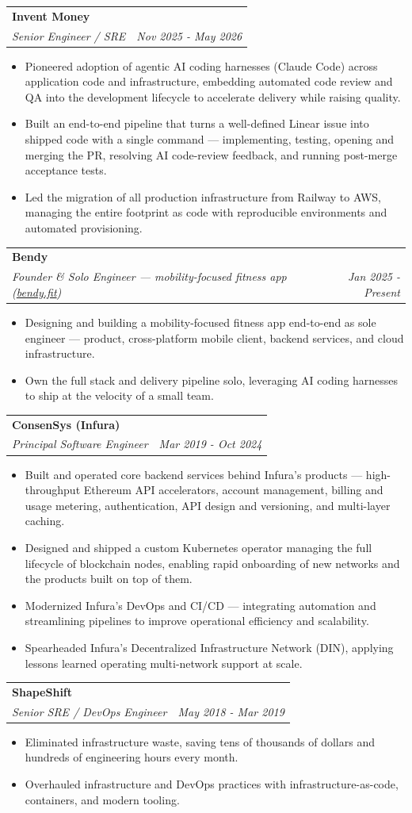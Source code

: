 \documentclass[letterpaper,11pt]{article}
\makeatletter
\newcommand{\resumeItemNoBold}[1]{
  \item\small{
    {#1 \vspace{-2pt}}
  }
}
\newcommand{\resumeSubheading}[3]{
  \needspace{4\baselineskip}\vspace{-1pt}\item
    \begin{tabular*}{0.97\textwidth}{l@{\extracolsep{\fill}}r}
      \textbf{\color{primary}#1} \\
      \textit{\small#2} & \textit{\small #3} \\
    \end{tabular*}\vspace{-5pt}
}
\newcommand{\resumeItemListStart}{\begin{itemize}[itemsep=0pt, topsep=2pt]}
\newcommand{\resumeItemListEnd}{\end{itemize}\vspace{-5pt}}
\makeatother
\begin{document}
    \resumeSubheading
      {Invent Money}
      {Senior Engineer / SRE}{Nov 2025 - May 2026}
      \resumeItemListStart
        \resumeItemNoBold {Pioneered adoption of agentic AI coding harnesses (Claude Code) across application code and infrastructure, embedding automated code review and QA into the development lifecycle to accelerate delivery while raising quality.}
        \resumeItemNoBold {Built an end-to-end pipeline that turns a well-defined Linear issue into shipped code with a single command --- implementing, testing, opening and merging the PR, resolving AI code-review feedback, and running post-merge acceptance tests.}
        \resumeItemNoBold {Led the migration of all production infrastructure from Railway to AWS, managing the entire footprint as code with reproducible environments and automated provisioning.}
      \resumeItemListEnd

    \resumeSubheading
      {Bendy}
      {Founder \& Solo Engineer --- mobility-focused fitness app (\href{https://bendy.fit}{bendy.fit})}{Jan 2025 - Present}
      \resumeItemListStart
        \resumeItemNoBold {Designing and building a mobility-focused fitness app end-to-end as sole engineer --- product, cross-platform mobile client, backend services, and cloud infrastructure.}
        \resumeItemNoBold {Own the full stack and delivery pipeline solo, leveraging AI coding harnesses to ship at the velocity of a small team.}
      \resumeItemListEnd

    \resumeSubheading
      {ConsenSys (Infura)}
      {Principal Software Engineer}{Mar 2019 - Oct 2024}
      \resumeItemListStart
        \resumeItemNoBold {Built and operated core backend services behind Infura's products --- high-throughput Ethereum API accelerators, account management, billing and usage metering, authentication, API design and versioning, and multi-layer caching.}
        \resumeItemNoBold {Designed and shipped a custom Kubernetes operator managing the full lifecycle of blockchain nodes, enabling rapid onboarding of new networks and the products built on top of them.}
        \resumeItemNoBold {Modernized Infura's DevOps and CI/CD --- integrating automation and streamlining pipelines to improve operational efficiency and scalability.}
        \resumeItemNoBold {Spearheaded Infura's Decentralized Infrastructure Network (DIN), applying lessons learned operating multi-network support at scale.}
      \resumeItemListEnd

    \resumeSubheading
      {ShapeShift}
      {Senior SRE / DevOps Engineer}{May 2018 - Mar 2019}
      \resumeItemListStart
        \resumeItemNoBold {Eliminated infrastructure waste, saving tens of thousands of dollars and hundreds of engineering hours every month.}
        \resumeItemNoBold {Overhauled infrastructure and DevOps practices with infrastructure-as-code, containers, and modern tooling.}
      \resumeItemListEnd
\end{document}
